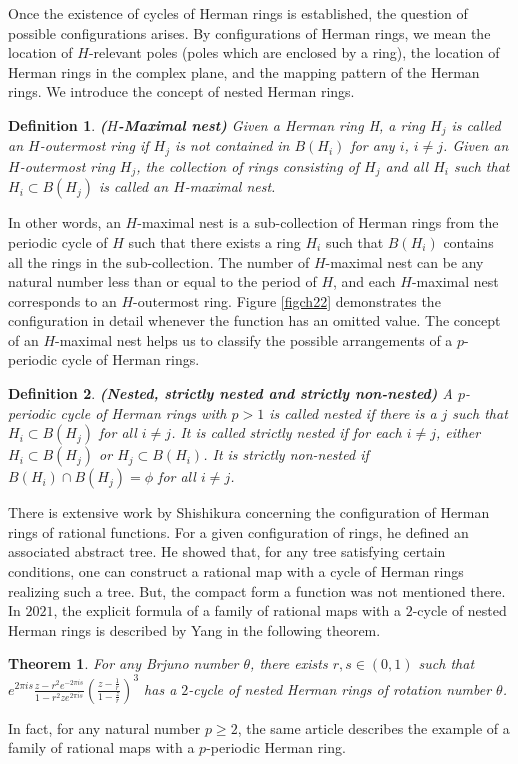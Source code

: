 \documentclass[12pt]{article}
\newtheorem{theorem}{Theorem}[section]
\newtheorem{definition}{Definition}[section]
\begin{document}
Once the existence of cycles of Herman rings is established, the question of possible configurations arises. By configurations of Herman rings, we mean the location of $H$-relevant poles (poles which are enclosed by a ring), the location of Herman rings in the complex plane,  and the mapping pattern of the Herman rings. We introduce the concept of nested Herman rings.
\begin{definition}{\bf{($H$-Maximal nest)}} 
	Given a Herman ring H, a ring $H_j$ is called an $H$-outermost ring if $H_j$ is not contained in $B(H_i)$ for any $i$, $i\neq j$. Given an $H$-outermost ring $H_j$, the collection of rings consisting of $H_j$ and all $H_i$ such that $H_i \subset B(H_j)$ is called an $H$-maximal nest.
\end{definition}
In other words, an $H$-maximal nest is a sub-collection of Herman rings from the periodic cycle of $H$ such that there exists a ring $H_i$ such that $B(H_i)$ contains all the rings in the sub-collection. The number of $H$-maximal nest can be any natural number less than or equal to the period of $H$, and each $H$-maximal nest corresponds to an $H$-outermost ring. Figure \ref{figch22} demonstrates the configuration in detail whenever the function has an omitted value. The concept of an $H$-maximal nest helps us to classify the possible arrangements of a $p$-periodic cycle of Herman rings. 
\begin{definition}{\bf{(Nested, strictly nested and strictly non-nested)}}
	A $p$-periodic cycle of Herman rings with $p>1$ is called nested if there is a $j$ such that $H_i \subset B(H_j)$ for all $i \neq j$. It is called strictly nested if for each $i\neq j$, either $H_i \subset B(H_j)$ or $H_j \subset B(H_i)$. It is strictly non-nested if $B(H_i)\cap B(H_j)= \phi$ for all $i \neq j$.
\end{definition}

There is extensive work by Shishikura \cite{smm,ms,mss} concerning the configuration of Herman rings of rational functions. For a given configuration of rings, he defined an associated abstract tree. He showed that, for any tree satisfying certain conditions, one can construct a rational map with a cycle of Herman rings realizing such a tree. But, the compact form a function was not mentioned there.  In $2021$, the explicit formula of a family of rational maps with a $2$-cycle of nested Herman rings is described by Yang \cite{yang} in the following theorem.
\begin{theorem}
	For any Brjuno number $\theta$, there exists $r,s\in (0,1)$ such that $e^{2\pi i s}\frac{z-r^2e^{-2\pi is}}{1-r^2z e^{2\pi is}}({\frac{z-\frac{1}{r}}{1-\frac{z}{r}}})^3$ has a $2$-cycle of nested Herman rings of rotation number $\theta$.
\end{theorem}
In fact, for any natural number $p\geq 2$, the same article describes the example of a family of rational maps with a $p$-periodic Herman ring.
\end{document}
